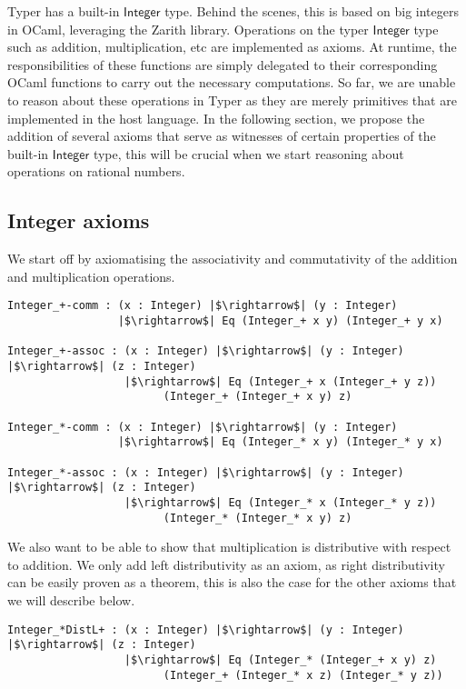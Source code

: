 \documentclass[12pt,twoside,maitrise]{dms}
\theoremstyle{definition}
\numberwithin{equation}{section}
\numberwithin{table}{chapter}
\numberwithin{figure}{chapter}
\newcommand\kw[1] {\textsf{#1}}
\begin{document}
Typer has a built-in $\kw{Integer}$ type. Behind the scenes, this is based on
big integers in OCaml, leveraging the Zarith library. Operations on the typer
$\kw{Integer}$ type such as addition, multiplication, etc are implemented as
axioms. At runtime, the responsibilities of these functions are simply delegated
to their corresponding OCaml functions to carry out the necessary computations.
So far, we are unable to reason about these operations in Typer as they are
merely primitives that are implemented in the host language. In the following
section, we propose the addition of several axioms that serve as witnesses of
certain properties of the built-in $\kw{Integer}$ type, this will be crucial
when we start reasoning about operations on rational numbers.

\subsection*{Integer axioms}
We start off by axiomatising the associativity and commutativity of the addition and multiplication operations.

\begin{verbatim}
Integer_+-comm : (x : Integer) |$\rightarrow$| (y : Integer)
                 |$\rightarrow$| Eq (Integer_+ x y) (Integer_+ y x)

Integer_+-assoc : (x : Integer) |$\rightarrow$| (y : Integer) |$\rightarrow$| (z : Integer)
                  |$\rightarrow$| Eq (Integer_+ x (Integer_+ y z))
                        (Integer_+ (Integer_+ x y) z)

Integer_*-comm : (x : Integer) |$\rightarrow$| (y : Integer)
                 |$\rightarrow$| Eq (Integer_* x y) (Integer_* y x)

Integer_*-assoc : (x : Integer) |$\rightarrow$| (y : Integer) |$\rightarrow$| (z : Integer)
                  |$\rightarrow$| Eq (Integer_* x (Integer_* y z))
                        (Integer_* (Integer_* x y) z)
\end{verbatim}

We also want to be able to show that multiplication is distributive with respect
to addition. We only add left distributivity as an axiom, as right
distributivity can be easily proven as a theorem, this is also the case for the
other axioms that we will describe below.

\begin{verbatim}
Integer_*DistL+ : (x : Integer) |$\rightarrow$| (y : Integer) |$\rightarrow$| (z : Integer)
                  |$\rightarrow$| Eq (Integer_* (Integer_+ x y) z)
                        (Integer_+ (Integer_* x z) (Integer_* y z))
\end{verbatim}
\end{document}
